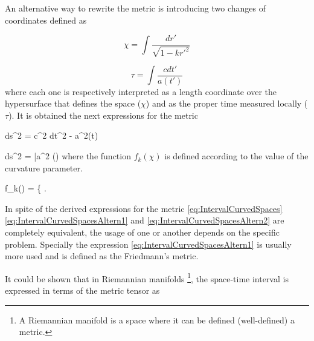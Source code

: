 An alternative way to rewrite the metric is introducing two changes of 
coordinates defined as



\[ \chi = \int \frac{ dr'}{\sqrt{1 - k r'^2}}\]


\[ \tau = \int \frac{ c dt'}{a(t')}\]
where each one is respectively interpreted as a length coordinate over the 
hypersurface that defines the space ($\chi$) and as the proper time 
measured locally ($\tau$). It is obtained the next expressions for the 
metric



{ ds^2 = c^2 dt^2 - a^2(t)  }


{ ds^2 = \bar a^2 (\tau) }
where the function $f_k(\chi)$ is defined according to the value of the 
curvature parameter.



{ f_k(\chi) = \left\{   \right.  }


In spite of the derived expressions for the metric 
\ref{eq:IntervalCurvedSpaces} \ref{eq:IntervalCurvedSpacesAltern1} and
\ref{eq:IntervalCurvedSpacesAltern2} are completely equivalent, the usage
of one or another depends on the specific problem. Specially the 
expression \ref{eq:IntervalCurvedSpacesAltern1} is usually more used and
is defined as the Friedmann's metric.


It could be shown that in Riemannian manifolds \footnote{A Riemannian 
manifold is a space where it can be defined (well-defined) a metric.},
the space-time interval is expressed in terms of the metric tensor as
\cite{weinberg1972}


